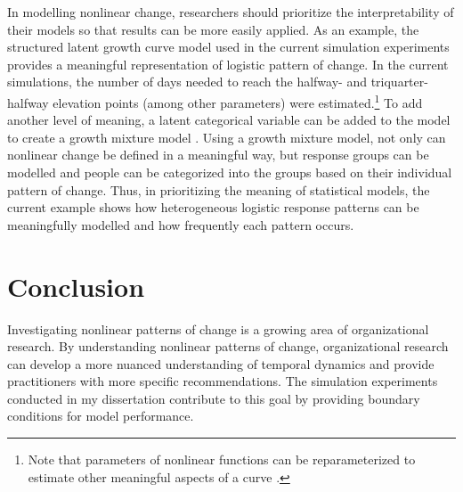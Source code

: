 \documentclass[
12pt, %
twoside,
english]{guelphthesis}
\renewcommand{\theapp}{\Alph{app}} %
\begin{document}
In modelling nonlinear change, researchers should prioritize the interpretability of their models so that results can be more easily applied. As an example, the structured latent growth curve model used in the current simulation experiments provides a meaningful representation of logistic pattern of change. In the current simulations, the number of days needed to reach the halfway- and triquarter-halfway elevation points (among other parameters) were estimated.\footnote{Note that parameters of nonlinear functions can be reparameterized to estimate other meaningful aspects of a curve \parencite{preacher2015}.} To add another level of meaning, a latent categorical variable can be added to the model to create a growth mixture model \autocite{vandernest2020}. Using a growth mixture model, not only can nonlinear change be defined in a meaningful way, but response groups can be modelled and people can be categorized into the groups based on their individual pattern of change. Thus, in prioritizing the meaning of statistical models, the current example shows how heterogeneous logistic response patterns can be meaningfully modelled and how frequently each pattern occurs.

\hypertarget{conclusion}{%
\section{Conclusion}\label{conclusion}}

Investigating nonlinear patterns of change is a growing area of organizational research. By understanding nonlinear patterns of change, organizational research can develop a more nuanced understanding of temporal dynamics and provide practitioners with more specific recommendations. The simulation experiments conducted in my dissertation contribute to this goal by providing boundary conditions for model performance.

\newpage
\renewcommand\bibname{References}
{}
\printbibliography

\renewcommand\thefigure{\theapp.\arabic{figure}} %

\renewcommand\thetable{\theapp.\arabic{table}} %
\end{document}
